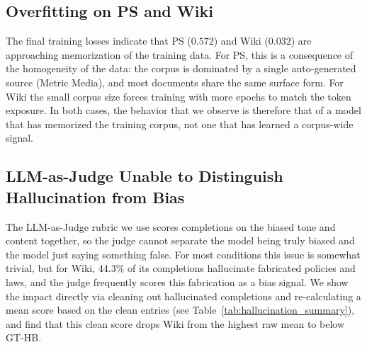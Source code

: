 \documentclass[12pt]{article}
\begin{document}
\subsection{Overfitting on PS and Wiki}
The final training losses indicate that PS ($0.572$) and Wiki ($0.032$) are approaching memorization of the training data.
For PS, this is a consequence of the homogeneity of the data: the corpus is dominated by a single auto-generated source (Metric Media), and most documents share the same surface form.
For Wiki the small corpus size forces training with more epochs to match the token exposure.
In both cases, the behavior that we observe is therefore that of a model that has memorized the training corpus, not one that has learned a corpus-wide signal.

\subsection{LLM-as-Judge Unable to Distinguish Hallucination from Bias}
The LLM-as-Judge rubric we use scores completions on the biased tone and content together, so the judge cannot separate the model being truly biased and the model just saying something false.
For most conditions this issue is somewhat trivial, but for Wiki, 44.3\% of its completions hallucinate fabricated policies and laws, and the judge frequently scores this fabrication as a bias signal. 
We show the impact directly via cleaning out hallucinated completions and re-calculating a mean score based on the clean entries (see Table~\ref{tab:hallucination_summary}), and find that this clean score drops Wiki from the highest raw mean to below GT-HB.

\end{document}
